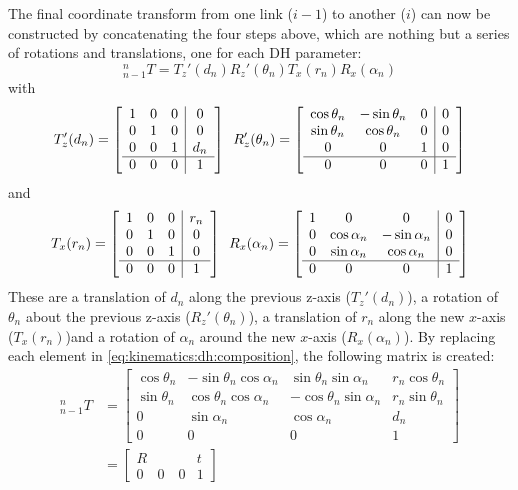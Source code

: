 The final coordinate transform from one link ($i-1$) to another ($i$) can now be constructed by concatenating the four steps above, which are nothing but a series of rotations and translations, one for each DH parameter:
%
\begin{equation}\label{eq:kinematics:dh:composition}
_{n-1}^nT=T_z'(d_n) R_z'(\theta_n) T_x(r_n)  R_x(\alpha_n)
\end{equation}
with
\begin{equation}
T_z'(d_n)=
\left[
\begin{array}{ccc|c}
1 & 0 & 0 & 0\\
0 & 1 & 0 & 0\\
0 & 0 & 1 & d_n\\
\hline
0 & 0 & 0 & 1
\end{array}
\right]
\enskip
R_z'(\theta_n)=\left[
\begin{array}{ccc|c}
\cos\theta_n & -\sin\theta_n & 0 & 0\\
\sin\theta_n & \cos\theta_n & 0 & 0\\
0 & 0 & 1 & 0\\
\hline
0 & 0 & 0 & 1
\end{array}
\right]
\end{equation}
and
\begin{equation}
T_x(r_n)=
\left[
\begin{array}{ccc|c}
1 & 0 & 0 & r_n\\
0 & 1 & 0 & 0\\
0 & 0 & 1 & 0\\
\hline
0 & 0 & 0 & 1
\end{array}
\right]
\enskip
R_x(\alpha_n)=\left[
\begin{array}{ccc|c}
1 & 0 & 0 & 0\\
0 & \cos\alpha_n & -\sin\alpha_n & 0\\
0 & \sin\alpha_n & \cos\alpha_n & 0\\
\hline
0 & 0 & 0 & 1
\end{array}
\right]
\end{equation}
%
These are a translation of $d_n$ along the previous z-axis ($T_z'(d_n)$), a rotation of $\theta_n$ about the previous z-axis ($R_z'(\theta_n)$), a translation of $r_n$ along the new $x$-axis ($T_x(r_n)$)and a rotation of $\alpha_n$ around the new $x$-axis ($R_x(\alpha_n)$).
%
By replacing each element in \cref{eq:kinematics:dh:composition}, the following matrix is created:
\begin{eqnarray}
_{n-1}^nT&=
\left[
\begin{array}{ccc|c}
\cos \theta_n & -\sin \theta_n \cos\alpha_n & \sin\theta_n \sin\alpha_n & r_n \cos\theta_n\\
\sin \theta_n & \cos\theta_n \cos\alpha_n & -\cos\theta_n\sin\alpha_n & r_n \sin\theta_n\\
0 & \sin\alpha_n & \cos\alpha_n & d_n \nonumber \\
\hline
0 & 0 & 0 & 1
\end{array}
\right]\\
&=
\left[
\begin{array}{c|c}
R & t\\
\hline
0 \quad 0 \quad 0 & 1
\end{array}
\right]
\end{eqnarray}
